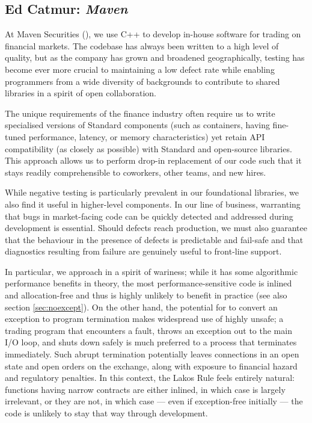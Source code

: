 \subsection{Ed Catmur: \emph{Maven}}

At Maven Securities (\hyperref[https://www.mavensecurities.com/]{}), we use C++ to develop in-house software for trading on financial markets. The codebase has always been written to a high level of quality, but as the company has grown and broadened geographically, testing has become ever more crucial to maintaining a low defect rate while enabling programmers from a wide diversity of backgrounds to contribute to shared libraries in a spirit of open collaboration.

The unique requirements of the finance industry often require us to write specialised versions of Standard components (such as containers, having fine-tuned performance, latency, or memory characteristics) yet retain API compatibility (as closely as possible) with Standard and open-source libraries. This approach allows us to perform drop-in replacement of our code such that it stays readily comprehensible to coworkers, other teams, and new hires.

While negative testing is particularly prevalent in our foundational libraries, we also find it useful in higher-level components. In our line of business, warranting that bugs in market-facing code can be quickly detected and addressed during development is essential. Should defects reach production, we must also guarantee that the behaviour in the presence of defects is predictable and fail-safe and that diagnostics resulting from failure are genuinely useful to front-line support.

In particular, we approach  in a spirit of wariness; while it has some algorithmic performance benefits in theory, the most performance-sensitive code is inlined and allocation-free and thus is highly unlikely to benefit in practice (see also section \ref{sec:noexcept}). On the other hand, the potential for  to convert an exception to program termination makes widespread use of  highly unsafe; a trading program that encounters a fault, throws an exception out to the main I/O loop, and shuts down safely is much preferred to a process that terminates immediately.  Such abrupt termination potentially leaves connections in an open state and open orders on the exchange, along with exposure to financial hazard and regulatory penalties. In this context, the Lakos Rule feels entirely natural: functions having narrow contracts are either inlined, in which case 
is largely irrelevant, or they are not, in which case --- even if exception-free initially --- the code is unlikely to stay that way through development.

